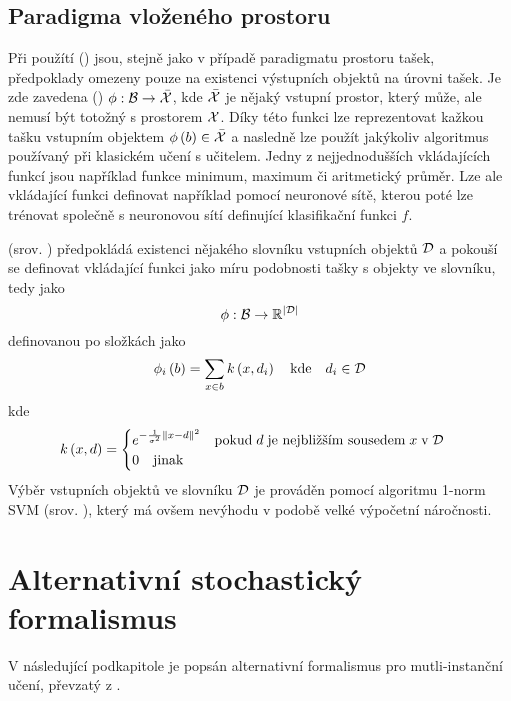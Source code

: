 \subsection{Paradigma vloženého prostoru}\label{embedded-space-paradigm}

Při použítí  () jsou, stejně jako v případě paradigmatu prostoru tašek, předpoklady omezeny pouze na existenci výstupních objektů na úrovni tašek. Je zde zavedena  () \( \phi : \mathcal B \to \bar{\mathcal X} \), kde \( \bar{\mathcal X} \) je nějaký vstupní prostor, který může, ale nemusí být totožný s prostorem \( \mathcal X \). Díky této funkci lze reprezentovat kažkou tašku vstupním objektem \( \phi \left( b \right) \in \bar{\mathcal X} \) a nasledně lze použít jakýkoliv algoritmus používaný při klasickém učení s učitelem. Jedny z nejjednodušších vkládajících funkcí jsou například funkce minimum, maximum či aritmetický průměr. Lze ale vkládající funkci definovat například pomocí neuronové sítě, kterou poté lze trénovat společně s neuronovou sítí definující klasifikační funkci \( f \).

 (srov.  \cite{chen_miles:_2006}) předpokládá existenci nějakého slovníku vstupních objektů \( \mathcal D \) a pokouší se definovat vkládající funkci jako míru podobnosti tašky s objekty ve slovníku, tedy jako
\[ \phi : \mathcal B \to \mathbb R^{\left| \mathcal D \right|} \]
definovanou po složkách jako
\[ \phi_i \left( b \right) = \sum_{x \in b} k \left( x, d_i \right) \quad \text{kde} \quad d_i \in \mathcal D \]
kde
\[ k \left( x, d \right) = \begin{cases}
	e^{- \frac{1}{\sigma^2} \left\Vert x - d \right\Vert^2} \quad \text{pokud} \; d \; \text{je nejbližším sousedem} \; x \; \text{v} \; \mathcal D \\
	0 \quad \text{jinak}
\end{cases} \]
Výběr vstupních objektů ve slovníku \( \mathcal D \) je prováděn pomocí algoritmu 1-norm SVM (srov. \cite{zhu_1-norm_2004}), který má ovšem nevýhodu v podobě velké výpočetní náročnosti.

\section{Alternativní stochastický formalismus}
V následující podkapitole je popsán alternativní formalismus pro mutli-instanční učení, převzatý z \cite{muandet_learning_2012}.


